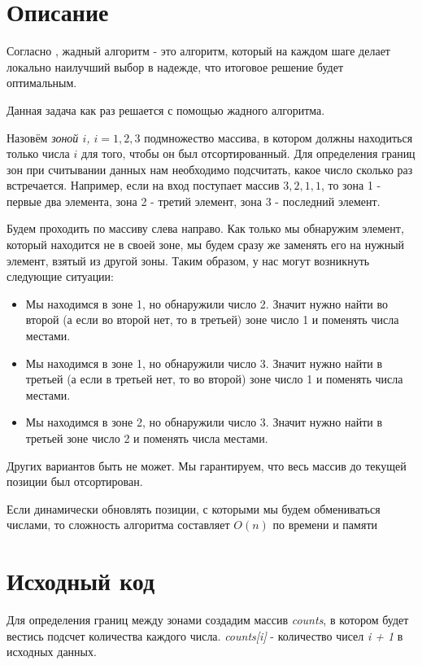 \section{Описание}

Согласно \cite{greedy-habr}, жадный алгоритм - это алгоритм, который на каждом шаге делает локально наилучший выбор в надежде, что итоговое решение будет оптимальным.

Данная задача как раз решается с помощью жадного алгоритма.

Назовём \textit{зоной $i$, $i = 1, 2, 3$} подмножество массива, в котором должны находиться только числа $i$ для того, чтобы он был отсортированный. Для определения границ зон при считывании данных нам необходимо подсчитать, какое число сколько раз встречается. Например, если на вход поступает массив $3, 2, 1, 1$, то зона 1 - первые два элемента, зона 2 - третий элемент, зона 3 - последний элемент.

Будем проходить по массиву слева направо. Как только мы обнаружим элемент, который находится не в своей зоне, мы будем сразу же заменять его на нужный элемент, взятый из другой зоны. Таким образом, у нас могут возникнуть следующие ситуации:

\begin{itemize}
    \item Мы находимся в зоне 1, но обнаружили число 2. Значит нужно найти во второй (а если во второй нет, то в третьей) зоне число 1 и поменять числа местами.
    \item Мы находимся в зоне 1, но обнаружили число 3. Значит нужно найти в третьей (а если в третьей нет, то во второй) зоне число 1 и поменять числа местами.
    \item Мы находимся в зоне 2, но обнаружили число 3. Значит нужно найти в третьей зоне число 2 и поменять числа местами.
\end{itemize}

Других вариантов быть не может. Мы гарантируем, что весь массив до текущей позиции был отсортирован.

Если динамически обновлять позиции, с которыми мы будем обмениваться числами, то сложность алгоритма составляет $O(n)$ по времени и памяти

\pagebreak

\section{Исходный код}
Для определения границ между зонами создадим массив \textit{counts}, в котором будет вестись подсчет количества каждого числа. \textit{counts[i]} - количество чисел \textit{i + 1} в исходных данных.

